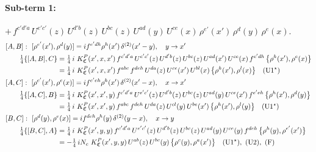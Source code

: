 \documentclass[10pt]{article}
\numberwithin{equation}{section}
\begin{document}
\paragraph{Sub-term 1:} $+\,f^{c'd'a}\,U^{e'c'}(z)\,U^{d'b}(z)\,U^{bc}(z)\,U^{ad}(y)\,U^{ce}(x)\,\rho^{e'}(x')\,\rho^{d}(y)\,\rho^{e}(x)$.
\begin{align}
&[A,B]:\ [\rho^{e'}(x'),\rho^{d}(y)]=i f^{e'dh}\rho^{h}(x')\,\delta^{(2)}(x'-y),\quad y\to x'\notag\\
&\qquad \tfrac14\{[A,B],C\}=\tfrac14\,i\,\,K^{P}_{\mathfrak C}(x',x,x')\,f^{c'd'a}\,U^{e'c'}(z)\,U^{d'b}(z)\,U^{bc}(z)\,U^{ad}(x')\,U^{ce}(x)\,f^{e'dh}\,\big\{\rho^{h}(x'),\rho^{e}(x)\big\}\notag\\
&\qquad\phantom{\tfrac14\{[A,B],C\}}=\tfrac14\,i\,\,K^{P}_{\mathfrak C}(x',x,x')\,f^{abc}\,f^{deh}\,U^{da}(z)\,U^{ce}(x')\,U^{bl}(x)\,\big\{\rho^{h}(x'),\rho^{l}(x)\big\}\quad\text{(U1$^\star$)}
\label{eq:GIII.VI.P-1-AB}\\
&[A,C]:\ [\rho^{e'}(x'),\rho^{e}(x)]=i f^{e'eh}\rho^{h}(x')\,\delta^{(2)}(x'-x),\quad x\to x'\notag\\
&\qquad \tfrac14\{[A,C],B\}=\tfrac14\,i\,\,K^{P}_{\mathfrak C}(x',x',y)\,f^{c'd'a}\,U^{e'c'}(z)\,U^{d'b}(z)\,U^{bc}(z)\,U^{ad}(y)\,U^{ce}(x')\,f^{e'eh}\,\big\{\rho^{h}(x'),\rho^{d}(y)\big\}\notag\\
&\qquad\phantom{\tfrac14\{[A,C],B\}}=\tfrac14\,i\,\,K^{P}_{\mathfrak C}(x',x',y)\,f^{abc}\,f^{deh}\,U^{da}(z)\,U^{cl}(y)\,U^{be}(x')\,\big\{\rho^{h}(x'),\rho^{l}(y)\big\}\quad\text{(U1$^\star$)}
\label{eq:GIII.VI.P-1-AC}\\
&[B,C]:\ [\rho^{d}(y),\rho^{e}(x)]=i f^{deh}\rho^{h}(y)\,\delta^{(2)}(y-x),\quad x\to y\notag\\
&\qquad \tfrac14\{[B,C],A\}=\tfrac14\,i\,\,K^{P}_{\mathfrak C}(x',y,y)\,f^{c'd'a}\,U^{e'c'}(z)\,U^{d'b}(z)\,U^{bc}(z)\,U^{ad}(y)\,U^{ce}(y)\,f^{deh}\,\big\{\rho^{h}(y),\rho^{e'}(x')\big\}\notag\\
&\qquad\phantom{\tfrac14\{[B,C],A\}}=-\tfrac14\,i N_{c}\,\,K^{P}_{\mathfrak C}(x',y,y)\,U^{ab}(z)\,U^{bc}(y)\,\big\{\rho^{c}(y),\rho^{a}(x')\big\}\quad\text{(U1$^\star$)},\ \text{(U2)},\ \text{(F)}
\label{eq:GIII.VI.P-1-BC}
\end{align}
\end{document}
